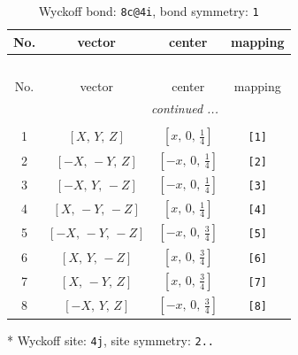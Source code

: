 \documentclass[fleqn,8pt]{jsarticle}
\begin{document}
\renewcommand{\arraystretch}{1.2}
\begin{longtable}{cccc}
\caption{Wyckoff bond: {\tt 8c@4i}, bond symmetry: {\tt 1}}
 \\
 \hline \hline
No. & vector & center & mapping \\ \hline \endfirsthead

\multicolumn{3}{l}{\tablename\ \thetable{}} \\
 \hline \hline
No. & vector & center & mapping \\ \hline \endhead

 \hline \hline
\multicolumn{3}{r}{\footnotesize\it continued ...} \\ \endfoot

 \hline \hline
\multicolumn{3}{r}{} \\ \endlastfoot

1 & $\left[ X,\, Y,\, Z \right]$ & $\left[ x,\, 0,\, \frac{1}{4} \right]$ & {\tt [1]} \\ \hline
2 & $\left[ - X,\, - Y,\, Z \right]$ & $\left[ - x,\, 0,\, \frac{1}{4} \right]$ & {\tt [2]} \\ \hline
3 & $\left[ - X,\, Y,\, - Z \right]$ & $\left[ - x,\, 0,\, \frac{1}{4} \right]$ & {\tt [3]} \\ \hline
4 & $\left[ X,\, - Y,\, - Z \right]$ & $\left[ x,\, 0,\, \frac{1}{4} \right]$ & {\tt [4]} \\ \hline
5 & $\left[ - X,\, - Y,\, - Z \right]$ & $\left[ - x,\, 0,\, \frac{3}{4} \right]$ & {\tt [5]} \\ \hline
6 & $\left[ X,\, Y,\, - Z \right]$ & $\left[ x,\, 0,\, \frac{3}{4} \right]$ & {\tt [6]} \\ \hline
7 & $\left[ X,\, - Y,\, Z \right]$ & $\left[ x,\, 0,\, \frac{3}{4} \right]$ & {\tt [7]} \\ \hline
8 & $\left[ - X,\, Y,\, Z \right]$ & $\left[ - x,\, 0,\, \frac{3}{4} \right]$ & {\tt [8]} \\
\end{longtable}
* Wyckoff site: {\tt 4j}, site symmetry: {\tt 2..}
\renewcommand{\arraystretch}{1.2}
\end{document}

